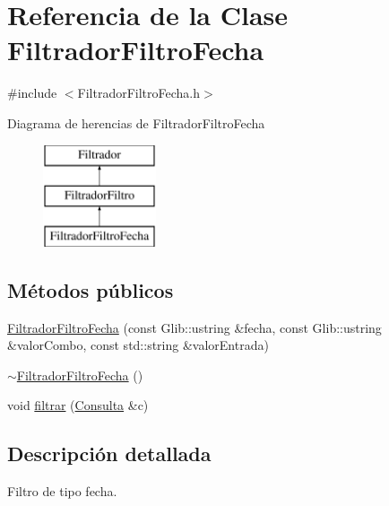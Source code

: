 \hypertarget{classFiltradorFiltroFecha}{\section{\-Referencia de la \-Clase \-Filtrador\-Filtro\-Fecha}
\label{classFiltradorFiltroFecha}
}


{\ttfamily \#include $<$\-Filtrador\-Filtro\-Fecha.\-h$>$}

\-Diagrama de herencias de \-Filtrador\-Filtro\-Fecha\begin{figure}[H]
\begin{center}
\leavevmode
\includegraphics[height=3.000000cm]{classFiltradorFiltroFecha}
\end{center}
\end{figure}
\subsection*{\-Métodos públicos}
\begin{DoxyCompactItemize}
\item 
\hyperlink{classFiltradorFiltroFecha_a6545fb5ca381d50aabc6cb2f8ff1d681}{\-Filtrador\-Filtro\-Fecha} (const \-Glib\-::ustring \&fecha, const \-Glib\-::ustring \&valor\-Combo, const std\-::string \&valor\-Entrada)
\item 
\hyperlink{classFiltradorFiltroFecha_ad9f88954f6da4b725e51a163085bc231}{$\sim$\-Filtrador\-Filtro\-Fecha} ()
\item 
void \hyperlink{classFiltradorFiltroFecha_a77bc9c5c32f89aae6b09b982ff1a1dee}{filtrar} (\hyperlink{classConsulta}{\-Consulta} \&c)
\end{DoxyCompactItemize}


\subsection{\-Descripción detallada}
\-Filtro de tipo fecha. 

